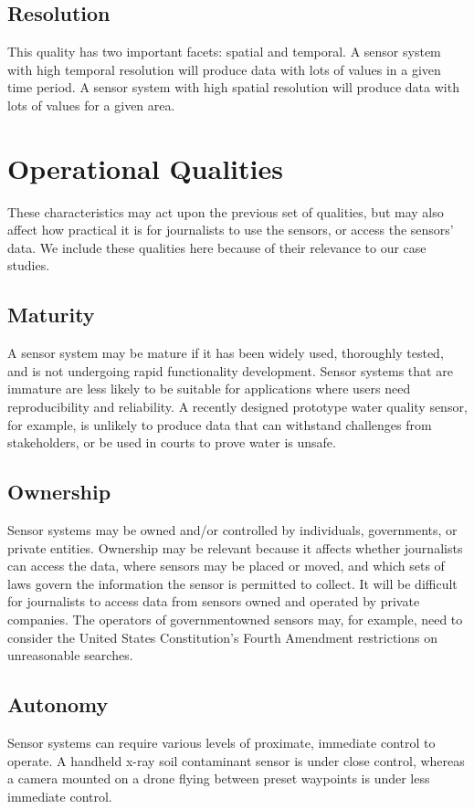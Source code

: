 \subsection{Resolution}
This quality has two important facets: spatial and temporal. A sensor system
with high temporal resolution will produce data with lots of values in a
given time period. A sensor system with high spatial resolution will produce
data with lots of values for a given area.

\section{Operational Qualities}
These characteristics may act upon the previous set of qualities, but may
also affect how practical it is for journalists to use the sensors, or access the
sensors' data. We include these qualities here because of their relevance to
our case studies.

\subsection{Maturity}
A sensor system may be mature if it has been widely used, thoroughly tested,
and is not undergoing rapid functionality development. Sensor systems that
are immature are less likely to be suitable for applications where users need
reproducibility and reliability. A recently designed prototype water quality
sensor, for example, is unlikely to produce data that can withstand challenges
from stakeholders, or be used in courts to prove water is unsafe.

\subsection{Ownership}
Sensor systems may be owned and/or controlled by individuals, governments,
or private entities. Ownership may be relevant because it affects
whether journalists can access the data, where sensors may be placed or
moved, and which sets of laws govern the information the sensor is permitted
to collect. It will be difficult for journalists to access data from sensors
owned and operated by private companies. The operators of governmentowned
sensors may, for example, need to consider the United States Constitution's
Fourth Amendment restrictions on unreasonable searches.

\subsection{Autonomy}
Sensor systems can require various levels of proximate, immediate control
to operate. A handheld x-ray soil contaminant sensor is under close control,
whereas a camera mounted on a drone flying between preset waypoints is
under less immediate control.

